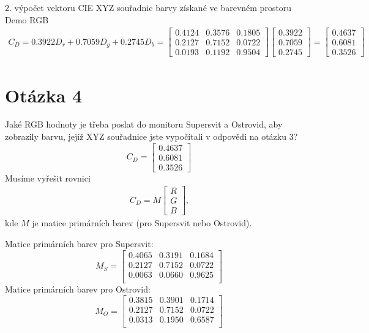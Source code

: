 \documentclass[11pt,a4paper]{article}
\begin{document}
2. výpočet vektoru CIE XYZ souřadnic barvy získané ve barevném prostoru Demo RGB
\begin{align}
    C_D = 0.3922 D_r + 0.7059 D_g + 0.2745 D_b = 
    \begin{bmatrix}
        0.4124 & 0.3576 & 0.1805 \\ 0.2127 & 0.7152 & 0.0722 \\ 0.0193 & 0.1192 & 0.9504
    \end{bmatrix}
    \begin{bmatrix} 0.3922 \\ 0.7059 \\ 0.2745 \end{bmatrix} = \begin{bmatrix} 0.4637 \\ 0.6081 \\ 0.3526 \end{bmatrix}
\end{align}

\section{Otázka 4} Jaké RGB hodnoty je třeba poslat do monitoru Supersvit a Ostrovid, aby zobrazily barvu, jejíž XYZ
souřadnice jste vypočítali v odpovědi na otázku 3?
\[
    C_D = \begin{bmatrix} 0.4637 \\ 0.6081 \\ 0.3526 \end{bmatrix}
\]
Musíme vyřešit rovnici 
\begin{align}
    C_D = M \begin{bmatrix} R \\ G \\ B \end{bmatrix}\text{,}
\end{align}
kde $M$ je matice primárních barev (pro Supersvit nebo Ostrovid).

Matice primárních barev pro Supersvit:
\[
    M_S = 
    \begin{bmatrix}
        0.4065 & 0.3191 & 0.1684 \\ 0.2127 & 0.7152 & 0.0722 \\ 0.0063 & 0.0660 & 0.9625 \\
    \end{bmatrix}
\]
Matice primárních barev pro Ostrovid:
\[
    M_O = 
    \begin{bmatrix}
        0.3815 & 0.3901 & 0.1714 \\ 0.2127 & 0.7152 & 0.0722 \\ 0.0313 & 0.1950 & 0.6587 \\
    \end{bmatrix}
\]
\end{document}
